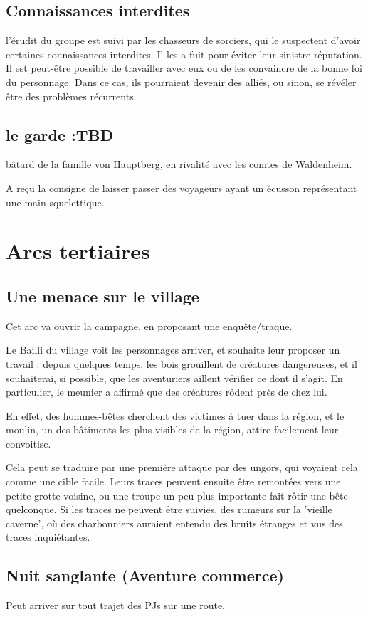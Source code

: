 \documentclass[10pt,a4paper]{book}
\begin{document}
\subsection{Connaissances interdites}
l'érudit du groupe est suivi par les chasseurs de sorciers, qui le suspectent d'avoir certaines connaissances interdites. Il les a fuit pour éviter leur sinistre réputation. Il est peut-être possible de travailler avec eux ou de les convaincre de la bonne foi du personnage. Dans ce cas, ils pourraient devenir des alliés, ou sinon, se révéler être des problèmes récurrents.
\subsection{le garde :TBD}
bâtard de la famille von Hauptberg, en rivalité avec les comtes de Waldenheim.

A reçu la consigne de laisser passer des voyageurs ayant un écusson représentant une main squelettique.
\section{Arcs tertiaires}
\subsection{Une menace sur le village}
Cet arc va ouvrir la campagne, en proposant une enquête/traque.

Le Bailli du village voit les personnages arriver, et souhaite leur proposer un travail : depuis quelques temps, les bois grouillent de créatures dangereuses, et il souhaiterai, si possible, que les aventuriers aillent vérifier ce dont il s'agit. En particulier, le meunier a affirmé que des créatures rôdent près de chez lui.

En effet, des hommes-bêtes cherchent des victimes à tuer dans la région, et le moulin, un des bâtiments les plus visibles de la région, attire facilement leur convoitise.

Cela peut se traduire par une première attaque par des ungors, qui voyaient cela comme une cible facile. Leurs traces peuvent ensuite être remontées vers une petite grotte voisine, ou une troupe un peu plus importante fait rôtir une bête quelconque. Si les traces ne peuvent être suivies, des rumeurs sur la 'vieille caverne', où des charbonniers auraient entendu des bruits étranges et vus des traces inquiétantes.
\subsection{Nuit sanglante (Aventure commerce)}
Peut arriver sur tout trajet des PJs sur une route.
\end{document}
